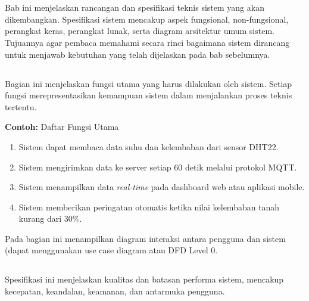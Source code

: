 \documentclass{elsinta}
\begin{document}
\section{\SystemSpecTitle}
Bab ini menjelaskan rancangan dan spesifikasi teknis sistem yang akan dikembangkan. 
Spesifikasi sistem mencakup aspek fungsional, non-fungsional, perangkat keras, perangkat lunak, serta diagram arsitektur umum sistem. 
Tujuannya agar pembaca memahami secara rinci bagaimana sistem dirancang untuk menjawab kebutuhan yang telah dijelaskan pada bab sebelumnya.

\subsection{\FunctionalSpecTitle}
Bagian ini menjelaskan fungsi utama yang harus dilakukan oleh sistem. 
Setiap fungsi merepresentasikan kemampuan sistem dalam menjalankan proses teknis tertentu. 

\textbf{Contoh:} Daftar Fungsi Utama
\begin{enumerate}
    \item Sistem dapat membaca data suhu dan kelembaban dari sensor DHT22. 
    \item Sistem mengirimkan data ke server setiap 60 detik melalui protokol MQTT. 
    \item Sistem menampilkan data \textit{real-time} pada dashboard web atau aplikasi mobile. 
    \item Sistem memberikan peringatan otomatis ketika nilai kelembaban tanah kurang dari 30\%. 
\end{enumerate}


Pada bagian ini menampilkan diagram interaksi antara pengguna dan sistem (dapat menggunakan use case diagram atau DFD Level 0.


\subsection{\NonFunctionalSpecTitle}
Spesifikasi ini menjelaskan kualitas dan batasan performa sistem, mencakup kecepatan, keandalan, keamanan, dan antarmuka pengguna.
\end{document}

